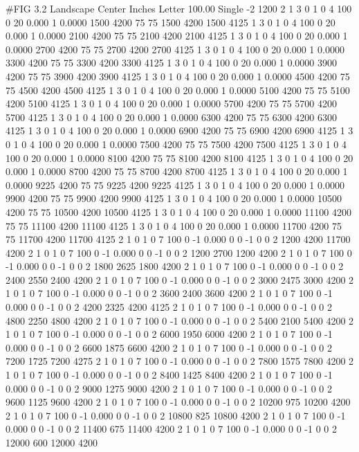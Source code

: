 #FIG 3.2
Landscape
Center
Inches
Letter  
100.00
Single
-2
1200 2
1 3 0 1 0 4 100 0 20 0.000 1 0.0000 1500 4200 75 75 1500 4200 1500 4125
1 3 0 1 0 4 100 0 20 0.000 1 0.0000 2100 4200 75 75 2100 4200 2100 4125
1 3 0 1 0 4 100 0 20 0.000 1 0.0000 2700 4200 75 75 2700 4200 2700 4125
1 3 0 1 0 4 100 0 20 0.000 1 0.0000 3300 4200 75 75 3300 4200 3300 4125
1 3 0 1 0 4 100 0 20 0.000 1 0.0000 3900 4200 75 75 3900 4200 3900 4125
1 3 0 1 0 4 100 0 20 0.000 1 0.0000 4500 4200 75 75 4500 4200 4500 4125
1 3 0 1 0 4 100 0 20 0.000 1 0.0000 5100 4200 75 75 5100 4200 5100 4125
1 3 0 1 0 4 100 0 20 0.000 1 0.0000 5700 4200 75 75 5700 4200 5700 4125
1 3 0 1 0 4 100 0 20 0.000 1 0.0000 6300 4200 75 75 6300 4200 6300 4125
1 3 0 1 0 4 100 0 20 0.000 1 0.0000 6900 4200 75 75 6900 4200 6900 4125
1 3 0 1 0 4 100 0 20 0.000 1 0.0000 7500 4200 75 75 7500 4200 7500 4125
1 3 0 1 0 4 100 0 20 0.000 1 0.0000 8100 4200 75 75 8100 4200 8100 4125
1 3 0 1 0 4 100 0 20 0.000 1 0.0000 8700 4200 75 75 8700 4200 8700 4125
1 3 0 1 0 4 100 0 20 0.000 1 0.0000 9225 4200 75 75 9225 4200 9225 4125
1 3 0 1 0 4 100 0 20 0.000 1 0.0000 9900 4200 75 75 9900 4200 9900 4125
1 3 0 1 0 4 100 0 20 0.000 1 0.0000 10500 4200 75 75 10500 4200 10500 4125
1 3 0 1 0 4 100 0 20 0.000 1 0.0000 11100 4200 75 75 11100 4200 11100 4125
1 3 0 1 0 4 100 0 20 0.000 1 0.0000 11700 4200 75 75 11700 4200 11700 4125
2 1 0 1 0 7 100 0 -1 0.000 0 0 -1 0 0 2
	 1200 4200 11700 4200
2 1 0 1 0 7 100 0 -1 0.000 0 0 -1 0 0 2
	 1200 2700 1200 4200
2 1 0 1 0 7 100 0 -1 0.000 0 0 -1 0 0 2
	 1800 2625 1800 4200
2 1 0 1 0 7 100 0 -1 0.000 0 0 -1 0 0 2
	 2400 2550 2400 4200
2 1 0 1 0 7 100 0 -1 0.000 0 0 -1 0 0 2
	 3000 2475 3000 4200
2 1 0 1 0 7 100 0 -1 0.000 0 0 -1 0 0 2
	 3600 2400 3600 4200
2 1 0 1 0 7 100 0 -1 0.000 0 0 -1 0 0 2
	 4200 2325 4200 4125
2 1 0 1 0 7 100 0 -1 0.000 0 0 -1 0 0 2
	 4800 2250 4800 4200
2 1 0 1 0 7 100 0 -1 0.000 0 0 -1 0 0 2
	 5400 2100 5400 4200
2 1 0 1 0 7 100 0 -1 0.000 0 0 -1 0 0 2
	 6000 1950 6000 4200
2 1 0 1 0 7 100 0 -1 0.000 0 0 -1 0 0 2
	 6600 1875 6600 4200
2 1 0 1 0 7 100 0 -1 0.000 0 0 -1 0 0 2
	 7200 1725 7200 4275
2 1 0 1 0 7 100 0 -1 0.000 0 0 -1 0 0 2
	 7800 1575 7800 4200
2 1 0 1 0 7 100 0 -1 0.000 0 0 -1 0 0 2
	 8400 1425 8400 4200
2 1 0 1 0 7 100 0 -1 0.000 0 0 -1 0 0 2
	 9000 1275 9000 4200
2 1 0 1 0 7 100 0 -1 0.000 0 0 -1 0 0 2
	 9600 1125 9600 4200
2 1 0 1 0 7 100 0 -1 0.000 0 0 -1 0 0 2
	 10200 975 10200 4200
2 1 0 1 0 7 100 0 -1 0.000 0 0 -1 0 0 2
	 10800 825 10800 4200
2 1 0 1 0 7 100 0 -1 0.000 0 0 -1 0 0 2
	 11400 675 11400 4200
2 1 0 1 0 7 100 0 -1 0.000 0 0 -1 0 0 2
	 12000 600 12000 4200
